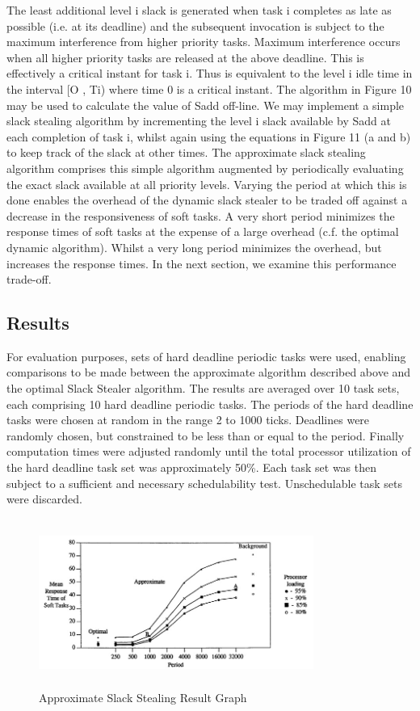 \documentclass[conference]{IEEEtran}
\begin{document}
The least additional level i slack is generated when
task i completes as late as possible (i.e. at its deadline) and
the subsequent invocation is subject to the maximum
interference from higher priority tasks. Maximum
interference occurs when all higher priority tasks are
released at the above deadline. This is effectively a
critical instant for task i. Thus is equivalent to
the level i idle time in the interval [O , Ti) where time 0 is
a critical instant. The algorithm in Figure 10 may be used to calculate
the value of Sadd off-line.
We may implement a simple slack stealing algorithm
by incrementing the level i slack available by Sadd at each
completion of task i, whilst again using the equations in Figure 11 (a and b) to keep track of the slack at other times. The
approximate slack stealing algorithm comprises this
simple algorithm augmented by periodically evaluating the exact slack available at all priority levels. Varying the
period at which this is done enables the overhead of the
dynamic slack stealer to be traded off against a decrease in
the responsiveness of soft tasks. A very short period
minimizes the response times of soft tasks at the expense
of a large overhead (c.f. the optimal dynamic algorithm).
Whilst a very long period minimizes the overhead, but
increases the response times. In the next section, we
examine this performance trade-off. 

\subsection{Results}
For evaluation purposes, sets of hard deadline
periodic tasks were used, enabling comparisons to be made between
the approximate algorithm described above and the
optimal Slack Stealer algorithm. The
results are averaged over 10 task sets, each comprising 10
hard deadline periodic tasks. The periods of the hard
deadline tasks were chosen at random in the range 2 to
1000 ticks. Deadlines were randomly chosen, but
constrained to be less than or equal to the period. Finally
computation times were adjusted randomly until the total
processor utilization of the hard deadline task set was
approximately 50\%. Each task set was then subject to a
sufficient and necessary schedulability test. Unschedulable
task sets were discarded.

\begin{figure}[h!]
	\includegraphics[width=9cm, height=5.5cm]{graph2}
	\caption{Approximate Slack Stealing Result Graph}
	\centering
\end{figure}
\end{document}
